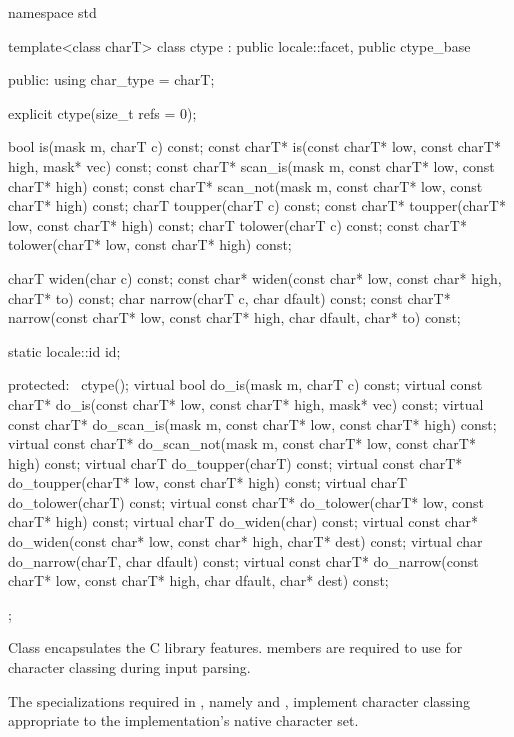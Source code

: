 %
\begin{codeblock}
namespace std {
  template<class charT>
    class ctype : public locale::facet, public ctype_base {
    public:
      using char_type = charT;

      explicit ctype(size_t refs = 0);

      bool         is(mask m, charT c) const;
      const charT* is(const charT* low, const charT* high, mask* vec) const;
      const charT* scan_is(mask m, const charT* low, const charT* high) const;
      const charT* scan_not(mask m, const charT* low, const charT* high) const;
      charT        toupper(charT c) const;
      const charT* toupper(charT* low, const charT* high) const;
      charT        tolower(charT c) const;
      const charT* tolower(charT* low, const charT* high) const;

      charT        widen(char c) const;
      const char*  widen(const char* low, const char* high, charT* to) const;
      char         narrow(charT c, char dfault) const;
      const charT* narrow(const charT* low, const charT* high, char dfault, char* to) const;

      static locale::id id;

    protected:
      ~ctype();
      virtual bool         do_is(mask m, charT c) const;
      virtual const charT* do_is(const charT* low, const charT* high, mask* vec) const;
      virtual const charT* do_scan_is(mask m, const charT* low, const charT* high) const;
      virtual const charT* do_scan_not(mask m, const charT* low, const charT* high) const;
      virtual charT        do_toupper(charT) const;
      virtual const charT* do_toupper(charT* low, const charT* high) const;
      virtual charT        do_tolower(charT) const;
      virtual const charT* do_tolower(charT* low, const charT* high) const;
      virtual charT        do_widen(char) const;
      virtual const char*  do_widen(const char* low, const char* high, charT* dest) const;
      virtual char         do_narrow(charT, char dfault) const;
      virtual const charT* do_narrow(const charT* low, const charT* high,
                                     char dfault, char* dest) const;
    };
}
\end{codeblock}

\pnum
Class  encapsulates the C library  features.
 members are required to use 
for character classing during input parsing.

\pnum
The specializations
required in ,
namely  and ,
implement character classing appropriate
to the implementation's native character set.

